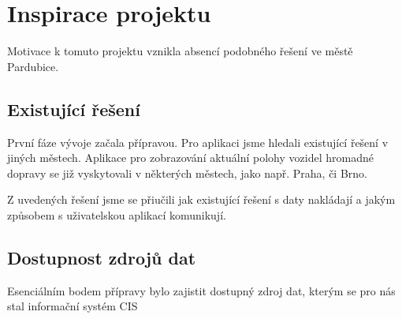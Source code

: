 \section{Inspirace projektu}
Motivace k tomuto projektu vznikla absencí podobného řešení ve městě Pardubice.

\subsection{Existující řešení}
První fáze vývoje začala přípravou. Pro aplikaci jsme hledali existující řešení v jiných městech.
Aplikace pro zobrazování aktuální polohy vozidel hromadné dopravy se již vyskytovali v některých městech, jako např. Praha, či Brno.

Z uvedených řešení jsme se přiučili jak existující řešení s daty nakládají a jakým způsobem s uživatelskou aplikací komunikují.

\subsection{Dostupnost zdrojů dat}
Esenciálním bodem přípravy bylo zajistit dostupný zdroj dat, kterým se pro nás stal informační systém CIS